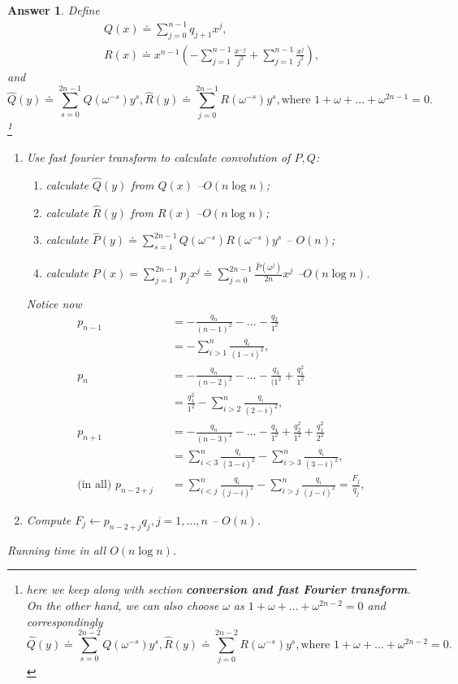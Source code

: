 \documentclass[11pt]{article}
\theoremstyle{numberplain}
\theoremstyle{nonumberplain}
\newtheorem{ans}{Answer}
\newcommand{\dps}{\displaystyle}
\newcommand{\0}{{\mathbf{0}}}
\begin{document}
\begin{ans} 
Define 
\begin{eqnarray*}
Q(x)\doteq %
\sum_{j=0}^{n-1} q_{j+1} x^{j}%
,\\
 R(x)\doteq x^{n-1}\left(-\sum_{j=1}^{n-1}\frac{x^{-j}}{j^2}+
 \sum_{j=1}^{n-1}\frac{x^j}{j^2}\right),
\end{eqnarray*}
and 
$$
\hat{Q}(y)\doteq \sum_{s=0}^{2n-1} Q(\omega^{-s})y^s, \hat{R}(y)\doteq \sum_{j=0}^{2n-1}R(\omega^{-s})y^s, \text{where }1+\omega+\ldots+\omega^{2n-1}=0.
$$\footnote{here we keep along with section \textbf{conversion and fast Fourier transform}. On the other hand, we can also choose $\omega$ as $1+\omega+\ldots+\omega^{2n-2}=0$ and correspondingly
$$
\hat{Q}(y)\doteq \sum_{s=0}^{2n-2} Q(\omega^{-s})y^s, \hat{R}(y)\doteq \sum_{j=0}^{2n-2}R(\omega^{-s})y^s, \text{where }1+\omega+\ldots+\omega^{2n-2}=0.
$$
}
\begin{code}
\begin{enumerate}
\item Use fast fourier transform to calculate convolution of $P,Q$:
\begin{enumerate}
\item calculate $\hat{Q}(y)$ from $Q(x)$ --$O(n\log n)$;
\item calculate $\hat{R}(y)$ from $R(x)$ --$O(n\log n)$;
\item calculate $\dps \hat{P}(y)\doteq \sum_{s=1}^{2n-1}Q(\omega^{-s})R(\omega^{-s})y^s$ -- $O(n)$;
\item calculate $\dps P(x)=\sum_{j=1}^{2n-1}p_jx^j\doteq \sum_{j=0}^{2n-1} \frac{\hat{P}(\omega^j)}{2n}x^j$ --$O(n\log n)$.	
\end{enumerate}
Notice now 
\begin{eqnarray*}
 p_{n-1}&& =-\frac{q_n}{(n-1)^2}-\ldots-\frac{q_2}{1^2}\\
 && =-\sum_{i>1}^{n}\frac{q_i}{(1-i)^2}, \\
   p_{n}&& =-\frac{q_{n}}{(n-2)^2}-\ldots-\frac{q_3}{(1^2}+\frac{q_1^2}{1^2}\\
   &&=\frac{q_1^2}{1^2}-\sum_{i>2}^{n}\frac{q_i}{(2-i)^2}, \\
      p_{n+1}&& =-\frac{q_{n}}{(n-3)^2}-\ldots-\frac{q_4}{1^2}+\frac{q_2^2}{1^2}+\frac{q_1^2}{2^2}\\
      &&=\sum_{i<3}^{n}\frac{q_i}{(3-i)^2}-\sum_{i>3}^{n}\frac{q_i}{(3-i)^2}, \\
      \text{(in all) } p_{n-2+j}&& =\sum_{i<j}^{n}\frac{q_i}{(j-i)^2}-\sum_{i>j}^{n}\frac{q_i}{(j-i)^2}=\frac{F_j}{q_j}, 
\end{eqnarray*}
\item Compute $F_j\leftarrow p_{n-2+j}q_j,j=1,\ldots, n$	-- $O(n)$.
\end{enumerate}
\end{code}
Running time in all $O(n\log n)$.
\end{ans}
\end{document}
